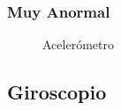 \subsubsection{Muy Anormal}
\begin{figure}[htbp!]
	\centering
	\caption{Acelerómetro}
	\label{fig:A4}
\end{figure}



\newpage
\subsection{Giroscopio}
